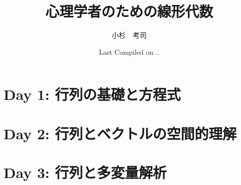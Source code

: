 \documentclass[dvipsnames]{ltjsbook}
\begin{document}

\VerbatimFootnotes
\title{心理学者のための線形代数}
\author{小杉　考司}
\date{Last Compiled on \number\year .\number\month .\number\day}
\maketitle
\setcounter{tocdepth}{1}



\tableofcontents
\part{Day 1: 行列の基礎と方程式}



\part{Day 2: 行列とベクトルの空間的理解}



\part{Day 3: 行列と多変量解析}




\appendix



\printbibliography[title=引用文献]

\printindex
\end{document}
